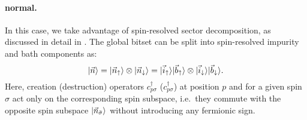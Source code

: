\documentclass[edipack_sp.tex]{subfiles}
\begin{document}
\paragraph{{\bf normal}.}
In this case, we take advantage of spin-resolved sector decomposition, 
as discussed in detail in 
. 
The global bitset can be split into spin-resolved 
impurity and bath components as:
\begin{equation}
|\vec{n}\rangle =
|\vec{n}_\uparrow\rangle\otimes |\vec{n}_\downarrow\rangle =
|\vec{i}_\uparrow\rangle|\vec{b}_\uparrow\rangle\otimes |\vec{i}_\downarrow\rangle|\vec{b}_\downarrow\rangle.
\label{eq:decomposition_for_rdm_normal}
\end{equation}
Here, creation (destruction) operators  $c^\dagger_{p\sigma}$
($c^\dagger_{p\sigma}$) at position $p$ and for a given spin $\sigma$
act only on the corresponding 
spin subspace, i.e.~they commute with the opposite spin 
subspace $|\vec{n}_{\bar{\sigma}}\rangle$ without introducing any 
fermionic sign.
\end{document}
